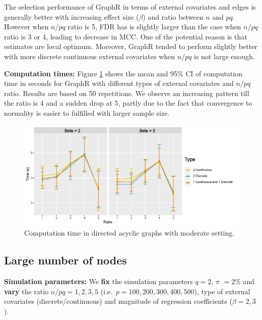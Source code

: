 \documentclass[
]{book}
\begin{document}
The selection performance of GraphR in terms of external covariates and edges is generally better with increasing effect size (\(\beta\)) and ratio between \(n\) and \(pq\). However when \(n/pq\) ratio is 5, FDR has is slightly larger than the case when \(n/pq\) ratio is 3 or 4, leading to decrease in MCC. One of the potential reason is that estimates are local optimum. Moreover, GraphR tended to perform slightly better with more discrete continuous external covariates when \(n/pq\) is not large enough.

\textbf{Computation times: }
Figure \ref{fig:modtime} shows the mean and 95\% CI of computation time in seconds for GraphR with different types of external covariates and \(n/pq\) ratio. Results are based on 50 repetitions. We observe an increasing pattern till the ratio is 4 and a sudden drop at 5, partly due to the fact that convergence to normality is easier to fulfilled with larger sample size.

\begin{figure}

{\centering \includegraphics[width=1\linewidth]{images/moderate_time} 

}

\caption{Computation time in directed acyclic graphs with moderate setting.}\label{fig:modtime}
\end{figure}

\hypertarget{largep}{%
\subsection{Large number of nodes}\label{largep}}

\textbf{Simulation parameters: }
We \textbf{fix} the simulation parameters \(q = 2\), \(\pi\) \(= 2\%\) and \textbf{vary} the ratio \(n/pq = 1,2,3,5\) (i.e.~\(p=100, 200, 300, 400, 500\)), type of external covariates (discrete/continuous) and magnitude of regression coefficients (\(\beta=2,3\)).
\end{document}
